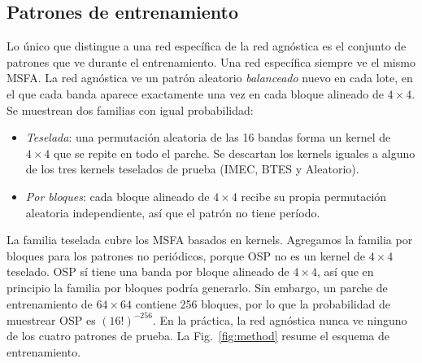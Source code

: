 \documentclass{article}
\begin{document}
\subsection{Patrones de entrenamiento}

Lo único que distingue a una red específica de la red agnóstica es el
conjunto de patrones que ve durante el entrenamiento. Una red específica
siempre ve el mismo MSFA. La red agnóstica ve un patrón aleatorio
\emph{balanceado} nuevo en cada lote, en el que cada banda aparece
exactamente una vez en cada bloque alineado de $4\times4$. Se muestrean dos
familias con igual probabilidad:
\begin{itemize}
  \item \emph{Teselada}: una permutación aleatoria de las 16 bandas forma un
        kernel de $4\times4$ que se repite en todo el parche. Se descartan
        los kernels iguales a alguno de los tres kernels teselados de prueba
        (IMEC, BTES y Aleatorio).
  \item \emph{Por bloques}: cada bloque alineado de $4\times4$ recibe su
        propia permutación aleatoria independiente, así que el patrón no
        tiene período.
\end{itemize}
La familia teselada cubre los MSFA basados en kernels. Agregamos la familia
por bloques para los patrones no periódicos, porque OSP no es un kernel de
$4\times4$ teselado. OSP sí tiene una banda por bloque alineado de
$4\times4$, así que en principio la familia por bloques podría generarlo.
Sin embargo, un parche de entrenamiento de $64\times64$ contiene 256
bloques, por lo que la probabilidad de muestrear OSP es $(16!)^{-256}$. En
la práctica, la red agnóstica nunca ve ninguno de los cuatro patrones de
prueba. La Fig.~\ref{fig:method} resume el esquema de entrenamiento.
\end{document}
